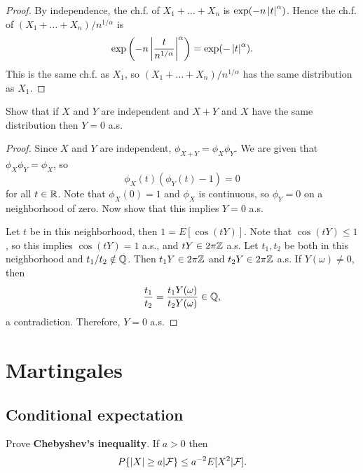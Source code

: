 \documentclass[a4paper]{article}
\begin{document}
\begin{proof}
  By independence, the ch.f. of $X_1 + \dots + X_n$ is 
  $\exp ( - n \left\lvert t\right\rvert^\alpha )$. Hence the ch.f. of 
  $(X_1 + \dots + X_n) / n^{1 / \alpha}$ is 
  \[
  \exp \left( - n \left\lvert \frac{t}{n^{1 / \alpha}}\right\rvert^\alpha \right) 
  = \exp (- \left\lvert t\right\rvert^\alpha ).
  \]
  This is the same ch.f. as $X_1$, so
  $(X_1 + \dots + X_n) / n^{1 / \alpha}$ has the same distribution
  as $X_1$.

\end{proof}

\begin{ex}[Durrett 3.3.23]
  Show that if $X$ and $Y$ are independent and $X + Y$ and
  $X$ have the same distribution then $Y = 0$ a.s.
\end{ex}

\begin{proof}
  Since $X$ and $Y$ are independent, $\phi_{X + Y} = \phi_X \phi_Y$.
  We are given that $\phi_X \phi_Y = \phi_X$, so 
  \[
  \phi_X (t) (\phi_Y (t) - 1) = 0
  \]
  for all $t \in \mathbb{R}$. Note that $\phi_X(0) = 1$ and $\phi_X$ is
  continuous, so $\phi_Y = 0$ on a neighborhood of zero. 
  Now show that this implies $Y = 0$ a.s.

  Let $t$ be in this neighborhood, then $1 = E[\cos (t Y)]$. 
  Note that $\cos (t Y) \leq 1$, so this implies 
  $\cos (t Y) = 1$ a.s., and $t Y \in 2 \pi \mathbb{Z}$ a.s. Let 
  $t_1, t_2$ be both in this neighborhood and $t_1 / t_2 \notin \mathbb{Q}$. 
  Then $t_1 Y \in 2 \pi \mathbb{Z}$ and $t_2 Y \in 2 \pi \mathbb{Z}$ a.s. If 
  $Y(\omega) \neq 0$, then 
  \[
  \frac{t_1}{t_2} = \frac{t_1 Y(\omega)}{t_2 Y(\omega)} \in \mathbb{Q},
  \]
  a contradiction. Therefore, $Y = 0$ a.s.

\end{proof}

\section{Martingales}

\subsection{Conditional expectation}

\begin{ex}[Durrett 4.1.2]
  Prove \textbf{Chebyshev's inequality}. If $a > 0$ then 
  \[
  P \{ \left\lvert X\right\rvert \geq a | \mathcal{F} \} \leq a^{-2} E[X^2 | \mathcal{F}].
  \]
\end{ex}
\end{document}
